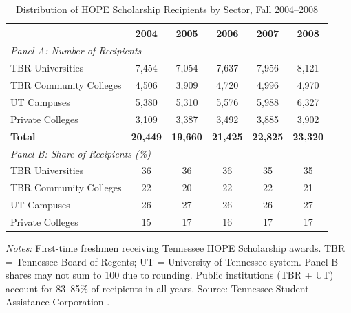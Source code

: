 \begin{table}[H]
\centering
\begin{threeparttable}
\caption{Distribution of HOPE Scholarship Recipients by Sector, Fall 2004--2008}
\label{tab:hope_distribution}
\begin{tabular}{lccccc}
\toprule
 & 2004 & 2005 & 2006 & 2007 & 2008 \\
\midrule
\multicolumn{6}{l}{\textit{Panel A: Number of Recipients}} \\[4pt]
\quad TBR Universities         & 7,454  & 7,054  & 7,637  & 7,956  & 8,121  \\
\quad TBR Community Colleges   & 4,506  & 3,909  & 4,720  & 4,996  & 4,970  \\
\quad UT Campuses              & 5,380  & 5,310  & 5,576  & 5,988  & 6,327  \\
\quad Private Colleges         & 3,109  & 3,387  & 3,492  & 3,885  & 3,902  \\
\midrule
\textbf{Total}                 & \textbf{20,449} & \textbf{19,660} & \textbf{21,425} & \textbf{22,825} & \textbf{23,320} \\
\midrule
\multicolumn{6}{l}{\textit{Panel B: Share of Recipients (\%)}} \\[4pt]
\quad TBR Universities         & 36   & 36   & 36   & 35   & 35   \\
\quad TBR Community Colleges   & 22   & 20   & 22   & 22   & 21   \\
\quad UT Campuses              & 26   & 27   & 26   & 26   & 27   \\
\quad Private Colleges         & 15   & 17   & 16   & 17   & 17   \\
\bottomrule
\end{tabular}
\begin{tablenotes}[flushleft]
\footnotesize
\item \textit{Notes:} First-time freshmen receiving Tennessee HOPE
  Scholarship awards. TBR = Tennessee Board of Regents; UT = University
  of Tennessee system. Panel B shares may not sum to 100 due to
  rounding. Public institutions (TBR + UT) account for 83--85\% of
  recipients in all years. Source: Tennessee Student Assistance
  Corporation \parencite{THEC2025}.
\end{tablenotes}
\end{threeparttable}
\end{table}
